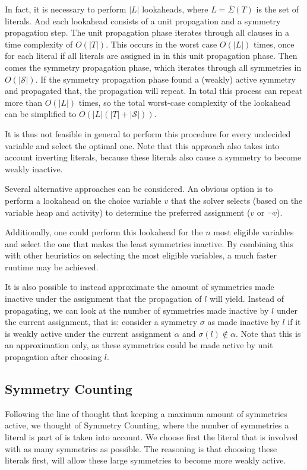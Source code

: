 	In fact, it is necessary to perform $|L|$ lookaheads, where $L = \bar{\Sigma}(T)$ is the set of literals.
	And each lookahead consists of a unit propagation and a symmetry propagation step.
	The unit propagation phase iterates through all clauses in a time complexity of $O(|T|)$.
	This occurs in the worst case $O(|L|)$ times,
	once for each literal if all literals are assigned in in this unit propagation phase.
	Then comes the symmetry propagation phase, which iterates through all symmetries in $O(|\mathcal{S}|)$.
	If the symmetry propagation phase found a (weakly) active symmetry and propagated that,
	the propagation will repeat.
	In total this process can repeat more than $O(|L|)$ times,
	so the total worst-case complexity of the lookahead can be simplified to $O(|L|(|T| + |\mathcal{S}|))$.
	

	It is thus not feasible in general to perform this procedure for every undecided variable and
	select the optimal one.
	Note that this approach also takes into account inverting literals,
	because these literals also cause a symmetry to become weakly inactive.
	
	Several alternative approaches can be considered.
	An obvious option is to perform a lookahead on the choice variable $v$ that the solver
	selects (based on the variable heap and activity) to determine the
	preferred assignment ($v$ or $\neg v$).

	Additionally, one could perform this lookahead for the $n$ most eligible variables
	and select the one that makes the least symmetries inactive.
	By combining this with other heuristics on selecting the most eligible variables,
	a much faster runtime may be achieved.

	It is also possible to instead approximate the amount of symmetries made inactive under the
	assignment that the propagation of $l$ will yield.
	Instead of propagating, we can look at the number of symmetries made inactive by $l$
	under the current assignment, that is: consider a symmetry $\sigma$ as
	made inactive by $l$ if it is weakly active under the current assignment $\alpha$ and
	$\sigma(l) \notin \alpha$.
	Note that this is an approximation only, as these symmetries could be made active by
	unit propagation after choosing $l$.

\subsection{Symmetry Counting}
	Following the line of thought that keeping a maximum amount of symmetries active,
	we thought of Symmetry Counting, where the number of symmetries a literal is part of is taken into account.
	We choose first the literal that is involved with as many symmetries as possible.
	The reasoning is that choosing these literals first, will allow these large symmetries to become more weakly active.

